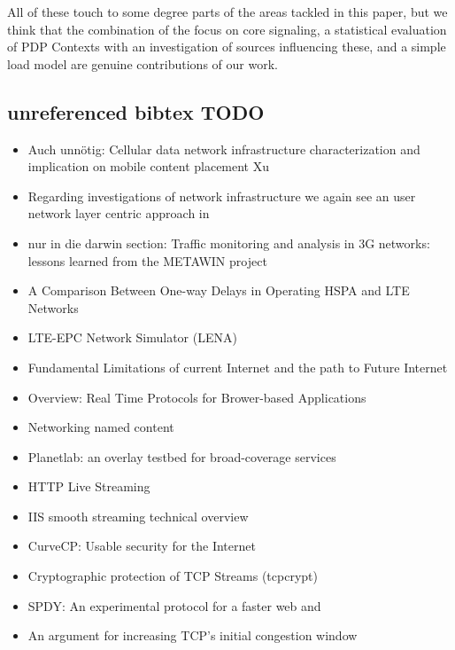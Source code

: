 All of these touch to some degree parts of the areas tackled in this paper, but we think that the combination of the focus on core signaling, a statistical evaluation of PDP Contexts with an investigation of sources influencing these, and a simple load model are genuine contributions of our work.



\subsection{unreferenced bibtex TODO}

\begin{itemize}
\item Auch unnötig: Cellular data network infrastructure characterization and implication on mobile content placement Xu\cite{Xu:2011:CDN:2007116.2007149}
\item Regarding investigations of network infrastructure we again see an user network layer centric approach in \cite{Xu:2011:CDN:2007116.2007149}
\item nur in die darwin section: Traffic monitoring and analysis in 3G networks: lessons learned from the METAWIN project \cite{ricciato2006traffic}
\item A Comparison Between One-way Delays in Operating HSPA and LTE Networks \cite{laner2012delaycomparison}
\item LTE-EPC Network Simulator (LENA) \cite{ns3lte}
\item Fundamental Limitations of current Internet and the path to Future Internet \cite{ec2011fundamental}
\item Overview: Real Time Protocols for Brower-based Applications\cite{ietf2011rtcwebdraft}
\item Networking named content \cite{jacobson2009networking}
\item Planetlab: an overlay testbed for broad-coverage services \cite{chun2003planetlab}
\item HTTP Live Streaming \cite{pantos2011livestreaming}
\item IIS smooth streaming technical overview \cite{zambelli_iis_2009}
\item CurveCP: Usable security for the Internet \cite{curvecpwww}
\item Cryptographic protection of TCP Streams (tcpcrypt) \cite{tcpcrypt}
\item SPDY: An experimental protocol for a faster web \cite{google2011SPDYdef} and \cite{google2010SPDYwp}
\item An argument for increasing TCP's initial congestion window \cite{dukkipati2010argument}

\end{itemize}
